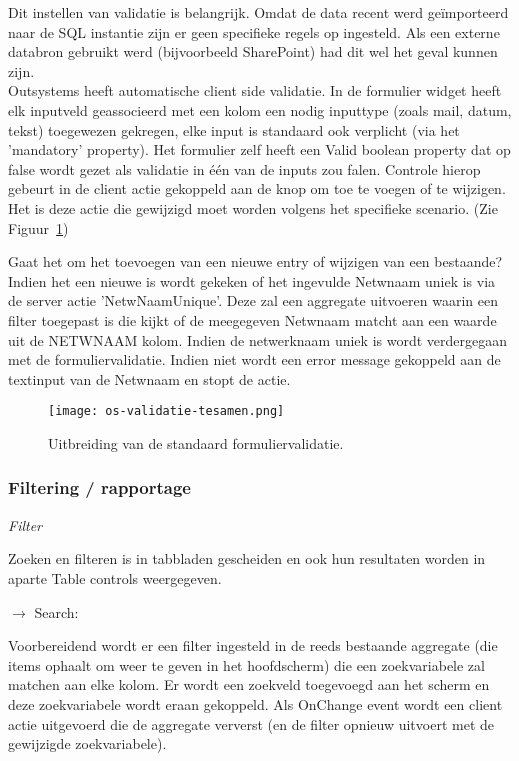 Dit instellen van validatie is belangrijk. Omdat de data recent werd geïmporteerd naar de SQL instantie zijn er geen specifieke regels op ingesteld. Als een externe databron gebruikt werd (bijvoorbeeld SharePoint) had dit wel het geval kunnen zijn.\\
Outsystems heeft automatische client side validatie. \autocite{OutSystemsDocs} In de formulier widget heeft elk inputveld geassocieerd met een kolom een nodig inputtype (zoals mail, datum, tekst) toegewezen gekregen, elke input is standaard ook verplicht (via het 'mandatory' property). Het formulier zelf heeft een Valid boolean property dat op false wordt gezet als validatie in één van de inputs zou falen. Controle hierop gebeurt in de client actie gekoppeld aan de knop om toe te voegen of te wijzigen. Het is deze actie die gewijzigd moet worden volgens het specifieke scenario. (Zie Figuur~\ref{fig:os-validatie-tesamen})

Gaat het om het toevoegen van een nieuwe entry of wijzigen van een bestaande? Indien het een nieuwe is wordt gekeken of het ingevulde Netwnaam uniek is via de server actie 'NetwNaamUnique'. Deze zal een aggregate uitvoeren waarin een filter toegepast is  die kijkt of de meegegeven Netwnaam matcht aan een waarde uit de NETWNAAM kolom. Indien de netwerknaam uniek is wordt verdergegaan met de formuliervalidatie. Indien niet wordt een error message gekoppeld aan de textinput van de Netwnaam en stopt de actie.

\begin{figure}[h!]
    \texttt{[image: os-validatie-tesamen.png]}
    \caption{Uitbreiding van de standaard formuliervalidatie.}
    \label{fig:os-validatie-tesamen}
\end{figure}

\subsubsection{Filtering / rapportage}

\textit{Filter}

Zoeken en filteren is in tabbladen gescheiden en ook hun resultaten worden in aparte Table controls weergegeven.

$\rightarrow$ Search:

Voorbereidend wordt er een filter ingesteld in de reeds bestaande aggregate (die items ophaalt om weer te geven in het hoofdscherm) die een zoekvariabele zal matchen aan elke kolom.
Er wordt een zoekveld toegevoegd aan het scherm en deze zoekvariabele wordt eraan gekoppeld. Als OnChange event wordt een client actie uitgevoerd die de aggregate ververst (en de filter opnieuw uitvoert met de gewijzigde zoekvariabele).

